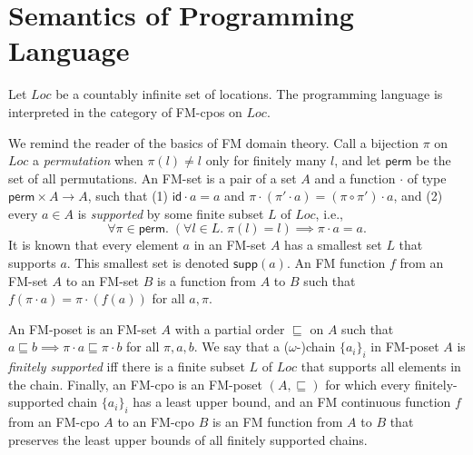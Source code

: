 \documentclass{LMCS}
\newcommand{\id}{\mathsf{id}}
\newcommand{\perm}{\mathsf{perm}}
\newcommand{\Loc}{\mathit{Loc}}
\newcommand{\supp}{\mathsf{supp}}
\begin{document}
\section{Semantics of Programming Language}
\label{sec:semantics-pl}
Let $\Loc$ be a countably infinite set of locations.
The programming language is interpreted in the category 
of FM-cpos on $\Loc$.

We remind the reader of the basics of FM domain theory.
Call a bijection $\pi$ on $\Loc$ a {\em permutation\/}
when $\pi(l) \not= l$ only for finitely many $l$,
and let $\perm$ be the set of all permutations.
An FM-set is a pair of a set $A$ and a function
$\cdot$ of type $\perm \times A \rightarrow A$, such
that (1) $\id \cdot a  = a$ and 
$\pi \cdot (\pi' \cdot a) = (\pi \circ \pi') \cdot a$, and (2)
every $a \in A$ is {\em supported\/} 
by some finite subset $L$ of $\Loc$, i.e.,
$$
  \forall \pi \in \perm.\;
    (\forall l \in L.\; \pi(l) = l)
    \implies
    \pi \cdot a = a.
$$
It is known that every element $a$ in an FM-set $A$ has
a smallest set $L$ that supports $a$. This smallest set
is denoted $\supp(a)$. An FM function $f$ from an FM-set $A$ to an FM-set $B$ is
a function from $A$ to $B$ such that 
$f(\pi \cdot a) = \pi \cdot (f(a))$ for all $a,\pi$.

An FM-poset is an FM-set $A$ with a partial order $\sqsubseteq$ on 
$A$ such that $a \sqsubseteq b \implies \pi \cdot a \sqsubseteq \pi \cdot b$
for all $\pi,a,b$. We say that a ($\omega$-)chain $\{a_i\}_i$ in FM-poset
$A$ is {\em finitely supported\/} 
iff there is a finite subset $L$ of $\Loc$
that supports all elements in the chain. Finally, an 
FM-cpo is an FM-poset $(A,\sqsubseteq)$ for which
 every finitely-supported 
chain $\{a_i\}_i$ has a least upper bound, and an FM continuous
function $f$ from an FM-cpo $A$ to an FM-cpo $B$ is
an FM function from $A$ to $B$ that preserves the least upper bounds
of all finitely supported chains.
\end{document}
